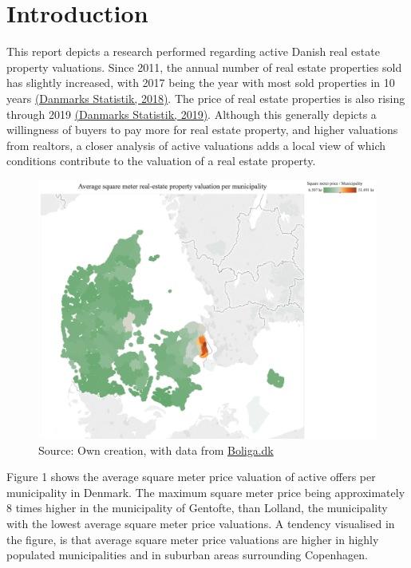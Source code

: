 \documentclass[12pt,a4paper]{article}
\begin{document}

\newpage
\onehalfspacing

\tableofcontents
\newpage
\section{Introduction}
This report depicts a research performed regarding active Danish real estate property valuations. Since 2011, the annual number of real estate properties sold has slightly increased, with 2017 being the year with most sold properties in 10 years \href{https://www.dst.dk/da/Statistik/nyt/NytHtml?cid=27979}{(Danmarks Statistik, 2018)}. The price of real estate properties is also rising through 2019 \href{https://www.dst.dk/da/Statistik/nyt/NytHtml?cid=28741}{(Danmarks Statistik, 2019)}. Although this generally depicts a willingness of buyers to pay more for real estate property, and higher valuations from realtors, a closer analysis of active valuations adds a local view of which conditions contribute to the valuation of a real estate property. \newline
\newcommand{\source}[1]{\caption*{Source: {#1}} }\begin{figure}[H]
\centering
\caption{}
\includegraphics[scale=0.4]{123.png}
\source{Own creation, with data from \href{https://www.boliga.dk}{Boliga.dk}}
\end{figure}

Figure 1 shows the average square meter price valuation of active offers per municipality in Denmark. The maximum square meter price being approximately 8 times higher in the municipality of Gentofte, than Lolland, the municipality with the lowest average square meter price valuations. A tendency visualised in the figure, is that average square meter price valuations are higher in highly populated municipalities and in suburban areas surrounding Copenhagen. \newline
\end{document}
